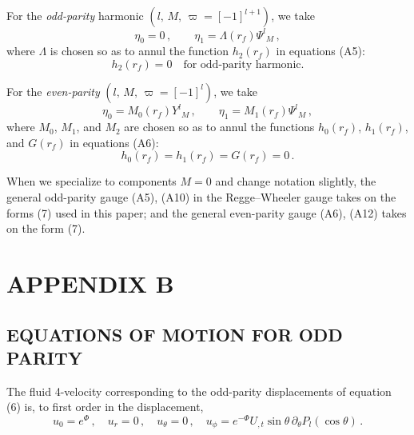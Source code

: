 For the \emph{odd-parity} harmonic $(l,\, M,\, \varpi = [-1]^{l+1})$, we take
%
\begin{equation}
\eta_0 = 0 \,,
\qquad
\eta_1 = \Lambda(r_f)\Psi^l{}_{M} \,,
\tag{A9}
\end{equation}
%
where $\Lambda$ is chosen so as to annul the function $h_2(r_f)$ in equations (A5):
%
\begin{equation}
h_2(r_f) = 0 \quad \text{for odd-parity harmonic.}
\tag{A10}
\end{equation}

For the \emph{even-parity} $(l,\, M,\, \varpi = [-1]^l)$, we take
%
\begin{equation}
\eta_0 = M_0(r_f)Y^l{}_{M} \,,
\qquad
\eta_1 = M_1(r_f)\Psi^l{}_{M} \,,
\tag{A11}
\end{equation}
%
where $M_0$, $M_1$, and $M_2$ are chosen so as to annul the functions $h_0(r_f)$, $h_1(r_f)$, and $G(r_f)$ in equations (A6):
%
\begin{equation}
h_0(r_f) = h_1(r_f) = G(r_f) = 0 \,.
\tag{A12}
\end{equation}

When we specialize to components $M = 0$ and change notation slightly, the general odd-parity
gauge (A5), (A10) in the Regge--Wheeler gauge takes on the forms (7) used in this
paper; and the general even-parity gauge (A6), (A12) takes on the form (7).

\appendix
\section*{APPENDIX B}
\subsection*{EQUATIONS OF MOTION FOR ODD PARITY}

The fluid 4-velocity corresponding to the odd-parity displacements of equation (6) is, to
first order in the displacement,
%
\begin{equation}
u_0 = e^{\Phi} \,,
\quad
u_r = 0 \,,
\quad
u_\theta = 0 \,,
\quad
u_\phi = e^{-\Phi} U_{,t} \sin\theta\, \partial_\theta P_l(\cos\theta) \,.
\tag{B1}
\end{equation}
